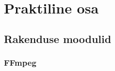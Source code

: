 \section{Praktiline osa}

\subsection{Rakenduse moodulid}


%
%
%
%
%
\subsubsection{FFmpeg}
\newpage